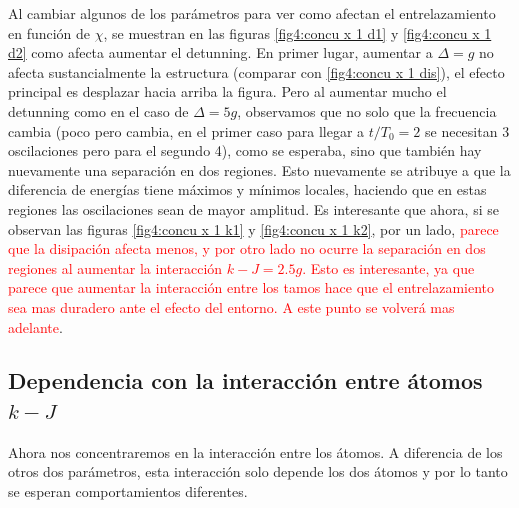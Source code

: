Al cambiar algunos de los parámetros para ver como afectan el entrelazamiento en función de $\chi$, se muestran en las figuras \ref{fig4:concu x 1 d1} y \ref{fig4:concu x 1 d2} como afecta aumentar el detunning. En primer lugar, aumentar a $\Delta=g$ no afecta sustancialmente la estructura (comparar con \ref{fig4:concu x 1 dis}), el efecto principal es desplazar hacia arriba la figura. Pero al aumentar mucho el detunning como en el caso de $\Delta=5g$, observamos que no solo que la frecuencia cambia (poco pero cambia, en el primer caso para llegar a $t/T_0=2$ se necesitan 3 oscilaciones pero para el segundo 4), como se esperaba, sino que también hay nuevamente una separación en dos regiones. Esto nuevamente se atribuye a que la diferencia de energías tiene máximos y mínimos locales, haciendo que en estas regiones las oscilaciones sean de mayor amplitud. Es interesante que ahora, si se observan las figuras \ref{fig4:concu x 1 k1} y \ref{fig4:concu x 1 k2}, por un lado, \textcolor{red}{parece que la disipación afecta menos, y por otro lado no ocurre la separación en dos regiones al aumentar la interacción $k-J=2.5g$. Esto es interesante, ya que parece que aumentar la interacción entre los tamos hace que el entrelazamiento sea mas duradero ante el efecto del entorno. A este punto se volverá mas adelante}.
\newpage
\subsection{Dependencia con la interacción entre átomos $k-J$}
Ahora nos concentraremos en la interacción entre los átomos. A diferencia de los otros dos parámetros, esta interacción solo depende los dos átomos y por lo tanto se esperan comportamientos diferentes. 
